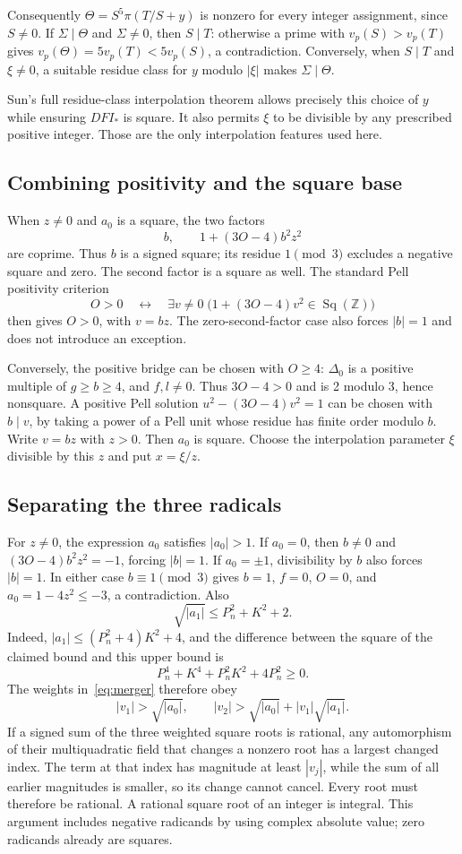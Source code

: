 \documentclass[11pt,letterpaper]{article}
\theoremstyle{definition}\newtheorem{definition}[theorem]{Definition}
\theoremstyle{remark}\newtheorem{remark}[theorem]{Remark}
\newcommand{\Z}{\mathbb Z}
\newcommand{\Sq}{\operatorname{Sq}}
\begin{document}
Consequently $\Theta=S^5\pi(T/S+y)$ is nonzero for every integer assignment, since $S\ne0$. If $\Sigma\mid\Theta$ and $\Sigma\ne0$, then $S\mid T$: otherwise a prime with $v_p(S)>v_p(T)$ gives $v_p(\Theta)=5v_p(T)<5v_p(S)$, a contradiction. Conversely, when $S\mid T$ and $\xi\ne0$, a suitable residue class for $y$ modulo $|\xi|$ makes $\Sigma\mid\Theta$.

Sun's full residue-class interpolation theorem allows precisely this choice of $y$ while ensuring $DFI_*$ is square. It also permits $\xi$ to be divisible by any prescribed positive integer. Those are the only interpolation features used here.

\subsection{Combining positivity and the square base}

When $z\ne0$ and $a_0$ is a square, the two factors
\[
 b,\qquad 1+(3O-4)b^2z^2
\]
are coprime. Thus $b$ is a signed square; its residue $1\pmod3$ excludes a negative square and zero. The second factor is a square as well. The standard Pell positivity criterion
\[
 O>0\quad\longleftrightarrow\quad
 \exists v\ne0\;\bigl(1+(3O-4)v^2\in\Sq(\Z)\bigr)
\]
then gives $O>0$, with $v=bz$. The zero-second-factor case also forces $|b|=1$ and does not introduce an exception.

Conversely, the positive bridge can be chosen with $O\ge4$: $\Delta_0$ is a positive multiple of $g\ge b\ge4$, and $f,l\ne0$. Thus $3O-4>0$ and is 2 modulo 3, hence nonsquare. A positive Pell solution $u^2-(3O-4)v^2=1$ can be chosen with $b\mid v$, by taking a power of a Pell unit whose residue has finite order modulo $b$. Write $v=bz$ with $z>0$. Then $a_0$ is square. Choose the interpolation parameter $\xi$ divisible by this $z$ and put $x=\xi/z$.

\subsection{Separating the three radicals}

For $z\ne0$, the expression $a_0$ satisfies $|a_0|>1$. If $a_0=0$, then $b\ne0$ and $(3O-4)b^2z^2=-1$, forcing $|b|=1$. If $a_0=\pm1$, divisibility by $b$ also forces $|b|=1$. In either case $b\equiv1\pmod3$ gives $b=1$, $f=0$, $O=0$, and $a_0=1-4z^2\le-3$, a contradiction. Also
\[
 \sqrt{|a_1|}\le P_n^2+K^2+2.
\]
Indeed, $|a_1|\le(P_n^2+4)K^2+4$, and the difference between the square of the claimed bound and this upper bound is
\[
 P_n^4+K^4+P_n^2K^2+4P_n^2\ge0.
\]
The weights in~\eqref{eq:merger} therefore obey
\[
 |v_1|>\sqrt{|a_0|},\qquad
 |v_2|>\sqrt{|a_0|}+|v_1|\sqrt{|a_1|}.
\]
If a signed sum of the three weighted square roots is rational, any automorphism of their multiquadratic field that changes a nonzero root has a largest changed index. The term at that index has magnitude at least $|v_j|$, while the sum of all earlier magnitudes is smaller, so its change cannot cancel. Every root must therefore be rational. A rational square root of an integer is integral. This argument includes negative radicands by using complex absolute value; zero radicands already are squares.
\end{document}
